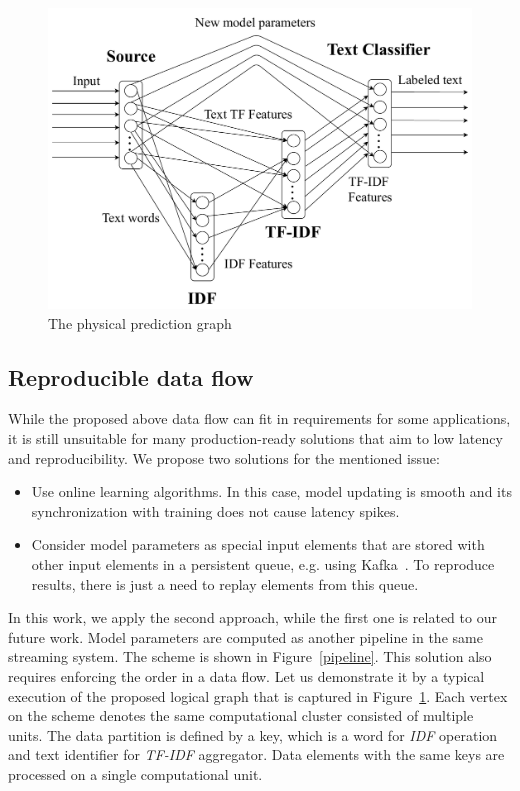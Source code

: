 \begin{figure}[htbp]
  \centering
  \includegraphics[scale=0.375]{pics/physical-graph}
  \caption{The physical prediction graph}
  \label {physical_graph}
\end{figure}

\subsection{Reproducible data flow}

While the proposed above data flow can fit in requirements for some applications, it is still unsuitable for many production-ready solutions that aim to low latency and reproducibility. We propose two solutions for the mentioned issue:

\begin{itemize}
    \item Use online learning algorithms. In this case, model updating is smooth and its synchronization with training does not cause latency spikes.
    \item Consider model parameters as special input elements that are stored with other input elements in a persistent queue, e.g. using Kafka~\cite{kreps2011kafka}. To reproduce results, there is just a need to replay elements from this queue.
\end{itemize}

In this work, we apply the second approach, while the first one is related to our future work. Model parameters are computed as another pipeline in the same streaming system. The scheme is shown in Figure~\ref{pipeline}. This solution also requires enforcing the order in a data flow. Let us demonstrate it by a typical execution of the proposed logical graph that is captured in Figure~\ref{physical_graph}. Each vertex on the scheme denotes the same computational cluster consisted of multiple units. The data partition is defined by a key, which is a word for {\em IDF} operation and text identifier for {\em TF-IDF} aggregator. Data elements with the same keys are processed on a single computational unit.

